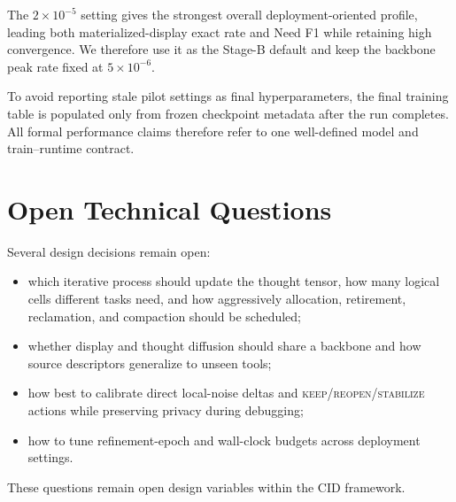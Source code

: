 The $2\times10^{-5}$ setting gives the strongest overall deployment-oriented profile, leading both materialized-display exact rate and Need F1 while retaining high convergence. We therefore use it as the Stage-B default and keep the backbone peak rate fixed at $5\times10^{-6}$.

To avoid reporting stale pilot settings as final hyperparameters, the final training table is populated only from frozen checkpoint metadata after the run completes. All formal performance claims therefore refer to one well-defined model and train--runtime contract.

\section{Open Technical Questions}
\label{app:questions}

Several design decisions remain open:
\begin{itemize}[leftmargin=*]
  \item which iterative process should update the thought tensor, how many logical cells different tasks need, and how aggressively allocation, retirement, reclamation, and compaction should be scheduled;
  \item whether display and thought diffusion should share a backbone and how source descriptors generalize to unseen tools;
  \item how best to calibrate direct local-noise deltas and \textsc{keep}/\textsc{reopen}/\textsc{stabilize} actions while preserving privacy during debugging;
  \item how to tune refinement-epoch and wall-clock budgets across deployment settings.
\end{itemize}
These questions remain open design variables within the CID framework.
